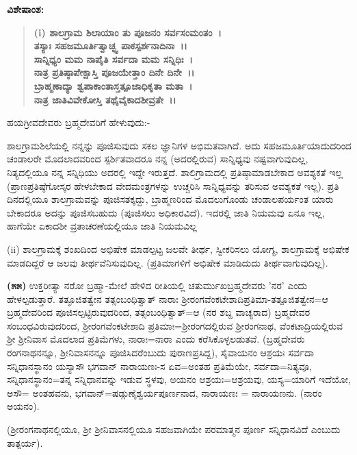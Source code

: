 \noindent
\textbf{ವಿಶೇಷಾಂಶ:\enginline{-}}

\begin{verse}
\textbf{(i) ಶಾಲಗ್ರಾಮ ಶಿಲಾಯಾಂ ತು ಪೂಜನಂ ಸರ್ವಸಂಮಂತಂ~।}\\\textbf{ತಸ್ಯಾಃ ಸಹಜಮೂರ್ತಿತ್ವಾಚ್ಛ್ವ ಪಾಕಸ್ಪರ್ಶನಾದಿನಾ~।।}\\\textbf{ಸಾನ್ನಿಧ್ಯಂ ಮಮ ನಾಪೈತಿ ಸರ್ವದಾ ಮಮ ಸನ್ನಿಧಿಃ~।}\\\textbf{ನಾತ್ರ ಪ್ರತಿಷ್ಠಾಪೇಕ್ಷಾಸ್ತಿ ಪೂಜಯೇತ್ತಾಂ ದಿನೇ ದಿನೇ~।।}\\\textbf{ಬ್ರಾಹ್ಮಣಾದ್ಯಾ ಶ್ವಪಾಕಾಂತಾಸ್ತತ್ಪೂಜಾಧಿಕೃತಾ ಮತಾ~।}\\\textbf{ನಾತ್ರ ಜಾತಿವಿವೇಕೋಸ್ತಿ ತಥೈವೈಕಾದಶೀವ್ರತೇ~।।}
\end{verse}


\noindent
ಹಯಗ್ರೀವದೇವರು ಬ್ರಹ್ಮದೇವರಿಗೆ ಹೇಳುವುದು:-

ಶಾಲಗ್ರಾಮಶಿಲೆಯಲ್ಲಿ ನನ್ನನ್ನು ಪೂಜಿಸುವುದು ಸಕಲ ಜ್ಞಾನಿಗಳ ಅಭಿಮತವಾಗಿದೆ. ಅದು ಸಹಜಮೂರ್ತಿಯಾದುದರಿಂದ ಚಂಡಾಲರೇ ಮೊದಲಾದವರಿಂದ ಸ್ಪರ್ಶಿತವಾದರೂ ನನ್ನ (ಅದರಲ್ಲಿರುವ) ಸಾನ್ನಿಧ್ಯವು ನಷ್ಟವಾಗುವುದಿಲ್ಲ, ನಿತ್ಯದಲ್ಲಿಯೂ ನನ್ನ ಸನ್ನಿಧಿಯು ಅದರಲ್ಲಿ ಇದ್ದೇ ಇರುತ್ತದೆ. ಶಾಲಿಗ್ರಾಮದಲ್ಲಿ ಪ್ರತಿಷ್ಠಾಮಾಡಬೇಕಾದ ಅವಶ್ಯಕತೆ ಇಲ್ಲ (ಪ್ರಾಣಪ್ರತಿಷ್ಠೆಗೋಸ್ಕರ ಹೇಳಬೇಕಾದ ವೇದಮಂತ್ರಗಳನ್ನು ಉಚ್ಚರಿಸಿ ಸಾನ್ನಿಧ್ಯವನ್ನು ತರಿಸುವ ಅವಶ್ಯಕತೆ ಇಲ್ಲ). ಪ್ರತಿ ದಿನದಲ್ಲಿಯೂ ಶಾಲಗ್ರಾಮವನ್ನು ಪೂಜಿಸತಕ್ಕದ್ದು, ಬ್ರಾಹ್ಮಣರಿಂದ ಮೊದಲುಗೊಂಡು ಚಂಡಾಲಪರ್ಯಂತ ಯಾರು ಬೇಕಾದರೂ ಅದನ್ನು ಪೂಜಿಸಬಹುದು (ಪೂಜಿಸಲು ಅಧಿಕಾರವಿದೆ). ಇದರಲ್ಲಿ ಜಾತಿ ನಿಯಮವು ಏನೂ ಇಲ್ಲ, ಹಾಗೆಯೇ ಏಕಾದಶೀ ವ್ರತಾಚರಣೆಯಲ್ಲಿಯೂ ಜಾತಿ ನಿಯಮವಿಲ್ಲ

(ii) ಶಾಲಗ್ರಾಮಕ್ಕೆ ಶಂಖದಿಂದ ಅಭಿಷೇಕ ಮಾಡಲ್ಪಟ್ಟ ಜಲವೇ ತೀರ್ಥ, ಸ್ವೀಕರಿಸಲು ಯೋಗ್ಯ, ಶಾಲಗ್ರಾಮಕ್ಕೆ ಅಭಿಷೇಕ ಮಾಡದಿದ್ದರೆ ಆ ಜಲವು ತೀರ್ಥವೆನಿಸುವುದಿಲ್ಲ. (ಪ್ರತಿಮಾ\-ಗಳಿಗೆ ಅಭಿಷೇಕ ಮಾಡಿದುದು ತೀರ್ಥವಾಗುವುದಿಲ್ಲ).

\textbf{(೫೫)} ಉಕ್ತರೀತ್ಯಾ ನರೋ ಬ್ರಹ್ಮಾ-ಮೇಲೆ ಹೇಳಿದ ರೀತಿಯಲ್ಲಿ ಚತುರ್ಮುಖಬ್ರಹ್ಮದೇವರು 'ನರ' ಎಂದು ಹೇಳಲ್ಪಡುತ್ತಾರೆ. ತತ್ಫೂಜಿತತ್ವೇನ ತತ್ಸಂಬಂಧಿತ್ವಾತ್ ನಾರಾಃ ಶ‍್ರೀರಂಗವೆಂಕಟೇಶಾದಿಪ್ರತಿಮಾ-ತತ್ಪೂಜಿತತ್ವೇನ=ಆ ಬ್ರಹ್ಮದೇವರಿಂದ ಪೂಜಿಸಲ್ಪಟ್ಟಿರುವುದರಿಂದ, ತತ್ಸಂಬಂಧಿತ್ವಾತ್=ಆ (ನರ ಶಬ್ದ ವಾಚ್ಯರಾದ) ಬ್ರಹ್ಮದೇವರ ಸಂಬಂಧವಿರುವುದರಿಂದ, ಶ‍್ರೀರಂಗವೆಂಕಟೇಶಾದಿ ಪ್ರತಿಮಾಃ=ಶ‍್ರೀರಂಗದಲ್ಲಿರುವ ಶ‍್ರೀರಂಗನಾಥ, ವೆಂಕಟಾದ್ರಿಯಲ್ಲಿರುವ ಶ‍್ರೀ ಶ‍್ರೀನಿವಾಸ ಮೊದಲಾದ ಪ್ರತಿಮೆಗಳು, ನಾರಾಃ=ನಾರಾ ಎಂದು ಕರೆಸಿಕೊಳ್ಳಲಡುತವೆ. (ಬ್ರಹ್ಮದೇವರು ರಂಗನಾಥನನ್ನೂ, ಶ‍್ರೀನಿವಾಸನನ್ನೂ ಪೂಜಿಸಿದರೆಂಬುದು ಪುರಾಣಪ್ರಸಿದ್ದ), ಸೈವಾಯನಂ ಆಶ್ರಯಃ ಸರ್ವದಾ ಸನ್ನಿಧಾನಸ್ಥಾನಂ ಯಸ್ಯಾಸೌ ಭಗವಾನ್ ನಾರಾಯಣಃ-ಸ ಏವ=ಅಂತಹ ಪ್ರತಿಮೆಯೇ, ಸರ್ವದಾ=ನಿತ್ಯವೂ, ಸನ್ನಿಧಾನ\-ಸ್ಥಾನಂ=ತನ್ನ ಸನ್ನಿಧಾನವನ್ನು ಇಡುವ ಸ್ಥಳವು, ಅಯನಂ ಆಶ್ರಯಃ=ಆಶ್ರಯವು, ಯಸ್ಯ=\break ಯಾರಿಗೆ ಇದೆಯೋ, ಅಸೌ= ಅಂತಹವನು, ಭಗವಾನ್=ಷಡ್ಗುಣೈಶ್ವರ್ಯಪೂರ್ಣನಾದ, ನಾರಾಯಣಃ = ನಾರಾಯಣನು. (ನಾರಂ ಅಯನಂ).

(ಶ‍್ರೀರಂಗನಾಥನಲ್ಲಿಯೂ, ಶ‍್ರೀ ಶ‍್ರೀನಿವಾಸನಲ್ಲಿಯೂ ಸಹಜವಾಗಿಯೇ ಪರಮಾತ್ಮನ ಪೂರ್ಣ ಸನ್ನಿಧಾನವಿದೆ ಎಂಬುದು ತಾತ್ಪರ್ಯ).

